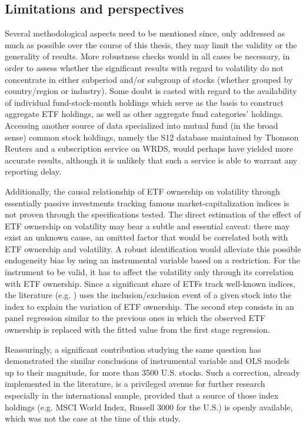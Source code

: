 \subsection{Limitations and perspectives}
Several methodological aspects need to be mentioned since, only addressed as much as possible over the course of this thesis, they may limit the validity or the generality of results. More robustness checks would in all cases be necessary, in order to assess whether the significant results with regard to volatility do not concentrate in either subperiod and/or subgroup of stocks (whether grouped by country/region or industry). Some doubt is casted with regard to the availability of individual fund-stock-month holdings which serve as the basis to construct aggregate ETF holdings, as well as other aggregate fund categories' holdings. Accessing another source of data specialized into mutual fund (in the broad sense) common stock holdings, namely the S12 database maintained by Thomson Reuters and a subscription service on WRDS, would perhaps have yielded more accurate results, although it is unlikely that such a service is able to warrant any reporting delay.

Additionally, the causal relationship of ETF ownership on volatility through essentially passive investments tracking famous market-capitalization indices is not proven through the specifications tested. The direct estimation of the effect of ETF ownership on volatility may bear a subtle and essential caveat: there may exist an unknown cause, an omitted factor that would be correlated both with ETF ownership and volatility. A robust identification would alleviate this possible endogeneity bias by using an instrumental variable based on a restriction. For the instrument to be valid, it has to affect the volatility only through its correlation with ETF ownership. Since a significant share of ETFs track well-known indices, the literature (e.g. \textcite{Ben-David2018}) uses the inclusion/exclusion event of a given stock into the index to explain the variation of ETF ownership. The second step consists in an panel regression similar to the previous ones in which the observed ETF ownership is replaced with the fitted value from the first stage regression.

Reassuringly, a significant contribution studying the same question \parencite{Ben-David2018} has demonstrated the similar conclusions of instrumental variable and OLS models up to their magnitude, for more than 3500 U.S. stocks. Such a correction, already implemented in the literature, is a privileged avenue for further research especially in the international sample, provided that a source of those index holdings (e.g. MSCI World Index, Russell 3000 for the U.S.) is openly available, which was not the case at the time of this study.

